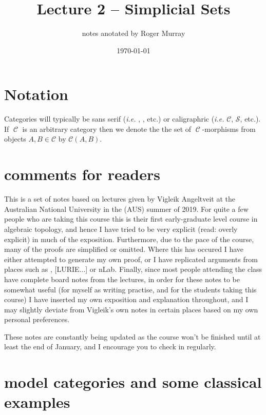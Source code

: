 \documentclass{amsart}
\newcommand{\catname}[1]{{\sffamily\upshape{{#1}}}}
\newcommand{\sset}{\catname{sSet}}
\newcommand{\topp}{\catname{Top}}
\DeclareMathOperator{\calC}{\mathcal{C}}
\theoremstyle{definition}
\begin{document}
\title{Lecture 2 -- Simplicial Sets}
\author{notes anotated by Roger Murray}
\date{\today}

\maketitle
\section{Notation}
Categories will typically be sans serif (\textit{i.e.} \topp, \sset, etc.) or caligraphric
(\textit{i.e.} $\mathcal{C}$, $\mathcal{S}$, etc.).
If $\calC$ is an arbitrary category then we denote the the set of $\calC$-morphisms from
objects $A,B\in \mathcal{C}$ by $\mathcal{C}(A,B)$.

\section{comments for readers}
This is a set of notes based on lectures given by Vigleik Angeltveit at
the Australian National University in the (AUS) summer of 2019.
For quite a few people who are taking this course this is their first
early-graduate level course in algebraic topology, and hence I have
tried to be very explicit (read: overly explicit) in much of the exposition.
Furthermore, due to the pace of the course, many of the proofs are simplified
or omitted. Where this has occured I have either attempted to generate my own
proof, or I have replicated arguments from places such as \cite{Hov},
[LURIE...]
or nLab. Finally, since most people attending the class have complete
board notes from the lectures, in order for these notes to be somewhat useful
(for myself as writing practise, and for the students taking this course)
I have inserted my own exposition and explanation throughout, and
I may slightly deviate from Vigleik's own notes in certain places
based on my own personal preferences.

These notes are constantly being updated as the course won't be finished
until at least the end of January, and I encourage you to check in regularly. 
\section{model categories and some classical examples}
\end{document}
